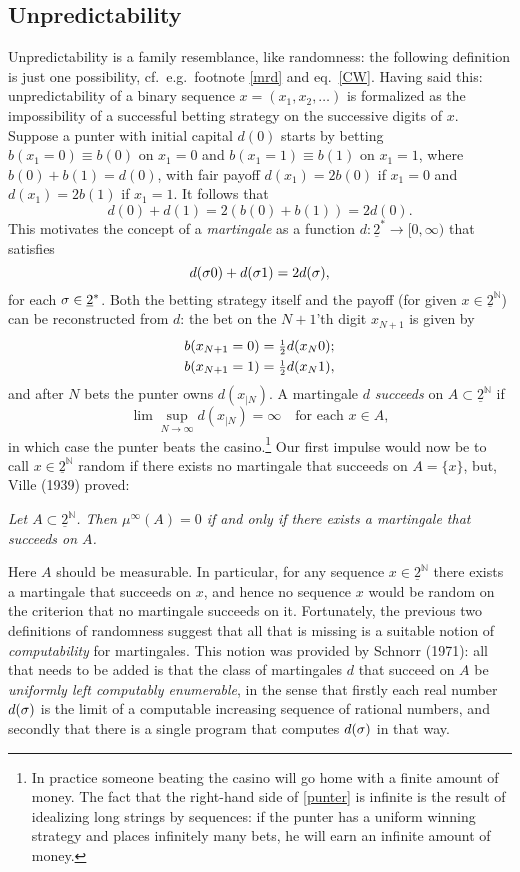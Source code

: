 \documentclass[11pt,a4paper]{article}
\numberwithin{equation}{section}
\newcommand{\half}{\mbox{\footnotesize $\frac{1}{2}$}}
\newcommand{\er}{\eqref}
\newcommand{\beq}{\begin{equation}}
\newcommand{\eeq}{\end{equation}}
\newcommand{\ul}{\underline}
\newcommand{\raw}{\rightarrow}
\newcommand{\N}{{\mathbb N}} \newcommand{\R}{{\mathbb R}}
\begin{document}
\subsection*{Unpredictability}
Unpredictability is  a family resemblance, like randomness: the following definition is just one possibility, cf.\ e.g.\ footnote \ref{mrd} and eq.\ \er{CW}. Having said this:
unpredictability of a binary sequence $x = (x_1, x_2, \ldots)$ 
is formalized as the impossibility of a successful betting strategy on the successive digits of $x$. Suppose a punter with initial capital $d(0)$ starts by betting
 $b(x_1=0)\equiv b(0)$ on $x_1 = 0$ and $b(x_1 = 1)\equiv b(1)$ on $x_1 = 1$, where $b(0) + b(1) = d(0)$, with fair payoff $d(x_1) = 2b(0)$  if $x_1 = 0$ and $d(x_1) = 2b(1)$ if $x_1 = 1$. It follows that  
 \beq
 d(0) +  d(1) =2( b(0) + b(1)) = 2d(0). \label{M0}
 \eeq 
 This motivates  the concept of a \emph{martingale} as a function $d: \ul{2}^*\raw[0,\infty)$ that satisfies 
 \begin{equation}
d(\sigma 0)+d(\sigma 1)=2d(\sigma),\label{M1}
\end{equation}
 for each $\sg\in \ul{2}^*$. Both the betting strategy itself and the payoff (for given $x\in \ul{2}^{\N}$) can be reconstructed from $d$: the bet on the $N+1$'th digit $x_{N+1}$ is given by
 \begin{align}
 b(x_{N+1}=0)&=\half d(x_{N}0);\\
 b(x_{N+1}=1)&=\half d(x_{N}1),
 \end{align} 
and after $N$ bets the punter owns $d(x_{|N})$. A martingale $d$ \emph{succeeds} on $A\subset \ul{2}^{\N}$ if
\begin{equation}
\lim\sup_{N\raw\infty} d(x_{|N})=\infty \:\:\: \mbox{ for each } x\in A, \label{punter}
\end{equation}
in which case the punter beats the casino.\footnote{In practice someone beating the casino will go home with a finite amount of money. The fact that the right-hand side of \er{punter} is infinite is the result of idealizing long strings by sequences: if the punter  has a uniform winning strategy and places infinitely many bets, he will earn an infinite amount of money. }
Our first impulse would now be to call $x\in \ul{2}^{\N}$ random if there exists no martingale that succeeds on $A=\{x\}$, but,  Ville (1939) proved:
\begin{center}
\emph{ Let $A\subset \ul{2}^{\N}$. Then $\mu^{\infty}(A)=0$ if and only if there exists a martingale that succeeds on $A$.}
\end{center}
Here $A$ should be measurable. In particular, for any sequence $x\in \ul{2}^{\N}$ there exists a martingale that succeeds on $x$, and hence no sequence $x$ would be random on the criterion that no martingale succeeds on it.  Fortunately, the previous two definitions of randomness suggest that all that is missing is a suitable notion of \emph{computability} for martingales.
This notion was provided by Schnorr (1971): all that needs to be added is that the class of martingales $d$ that succeed on $A$ be \emph{uniformly left computably enumerable}, in the sense that  firstly each real number $d(\sigma)$ 
 is the limit of a computable increasing sequence of rational numbers, and secondly that there is a single program that computes $d(\sigma)$ in that way. 
 
\end{document}
